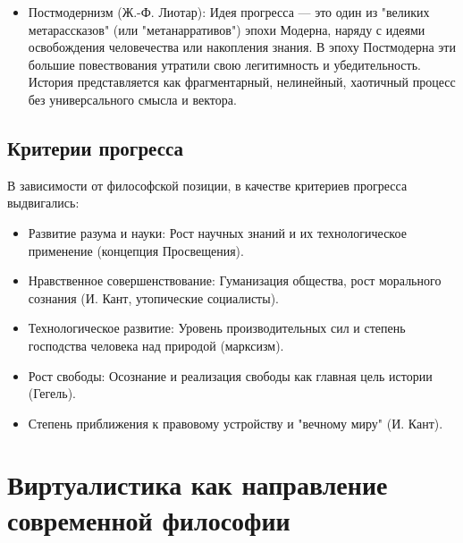 \documentclass[12pt,a4paper]{article}
\begin{document}
\begin{itemize}
\begin{itemize}
			\item Постмодернизм (Ж.-Ф. Лиотар): Идея прогресса --- это один из "великих метарассказов" (или "метанарративов") эпохи Модерна, наряду с идеями освобождения человечества или накопления знания. В эпоху Постмодерна эти большие повествования утратили свою легитимность и убедительность. История представляется как фрагментарный, нелинейный, хаотичный процесс без универсального смысла и вектора.
		\end{itemize}
	\end{itemize}
	\subsection{Критерии прогресса}
	В зависимости от философской позиции, в качестве критериев прогресса выдвигались:
	\begin{itemize}
		\item Развитие разума и науки: Рост научных знаний и их технологическое применение (концепция Просвещения).
		\item Нравственное совершенствование: Гуманизация общества, рост морального сознания (И. Кант, утопические социалисты).
		\item Технологическое развитие: Уровень производительных сил и степень господства человека над природой (марксизм).
		\item Рост свободы: Осознание и реализация свободы как главная цель истории (Гегель).
		\item Степень приближения к правовому устройству и "вечному миру" (И. Кант).
	\end{itemize}
	
	\section{Виртуалистика как направление современной философии~\checkmark}
\end{document}
